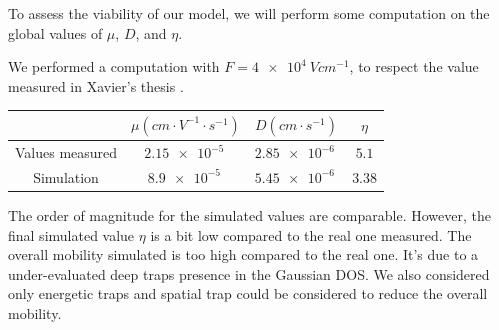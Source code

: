 To assess the viability of our model, we will perform some computation on the global values of $\mu$, $D$, and $\eta$.

We performed a computation with $F = \SI{4e4}{V cm^{-1}}$, to respect the value measured in Xavier's thesis \cite{xavier_thesis}.

\begin{center}
    \begin{tabular}{ |c||c|c|c|  }
        \hline
        & $\mu (\si{cm \cdot V^{-1} \cdot s^{-1}})$ & $D (\si{cm \cdot s^{-1}})$ & $\eta$ \\
        \hline
        \hline
        Values measured & $\SI{2.15e-5}{}$ & $\SI{2.85e-6}{}$ & $5.1$ \\
        \hline
        Simulation & $\SI{8.9e-5}{}$ & $\SI{5.45e-6}{}$ & $3.38$ \\
        \hline
    \end{tabular}
\end{center}

The order of magnitude for the simulated values are comparable. However, the final simulated value $\eta$ is a bit low compared to the real one measured. The overall mobility simulated is too high compared to the real one. It's due to a under-evaluated deep traps presence in the Gaussian DOS. We also considered only energetic traps and spatial trap could be considered to reduce the overall mobility.